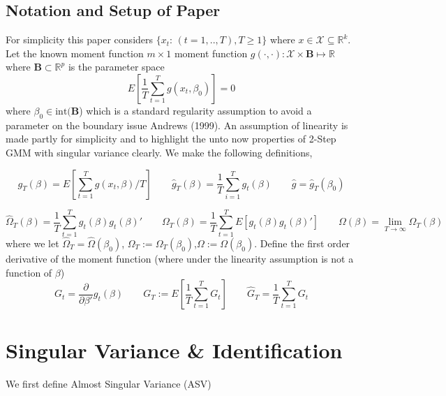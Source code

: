 \documentclass[11pt, fleqn]{article}
\begin{document}
\subsection{Notation  and Setup of Paper}
For simplicity this paper considers $\{x_t$: $(t=1,..,T),T\geq 1\}$ where $x \in \mathcal{X}\subseteq\mathbb{R}^k$. Let the known  moment function $m\times 1$ moment function $g(\cdot,\cdot): \mathcal{X} \times \mathbf{B}\mapsto\mathbb{R}$ where $\mathbf{B}\subset \mathbb{R}^p$  is the parameter space 
\begin{equation}\label{moment} E[\frac{1}{T}\sum_{t=1}^{T} g(x_t,\beta_0)]=0 \end{equation}
where $\beta_0\in \textrm{int}(\mathbf{B}$) which is a standard regularity assumption to avoid a parameter on the boundary issue Andrews (1999). An assumption of linearity is made partly for simplicity and to highlight the unto now properties of 2-Step GMM with singular variance clearly. We make the following definitions,

 \begin{equation} g_T(\beta)= E[\sum_{t=1}^{T} g(x_t,\beta)/T] \qquad \hat{g}_T(\beta)=\frac{1}{T} \sum_{i=1}^T g_t(\beta) \qquad \hat{g}=\hat{g}_T(\beta_0) \end{equation}
 
 
 \begin{equation} \hat{\Omega}_T(\beta)=\frac{1}{T}\sum_{t=1}^T g_t(\beta) g_t(\beta)' \qquad \Omega_T(\beta)=\frac{1}{T}\sum_{t=1}^TE[g_t(\beta)g_t(\beta)'] \qquad \Omega(\beta)=\underset{T\rightarrow \infty}{ \lim} \Omega_T(\beta) \end{equation}
 where we let  $\hat{\Omega}_T=\hat{\Omega}(\beta_0)$, $\Omega_T:=\Omega_T(\beta_0)$,$ \Omega:=\Omega(\beta_0)$. Define the first order derivative of the moment function (where under the linearity assumption is not a function of $\beta$)\\
\begin{equation} G_t=\frac{\partial}{\partial \beta'} g_t(\beta) \qquad G_T:=E[\frac{1}{T}\sum_{t=1}^TG_t] \qquad \hat{G}_T=\frac{1}{T} \sum_{t=1}^T G_t \end{equation}

\section{Singular Variance \& Identification}
We first define  Almost Singular Variance (ASV) 
\end{document}
